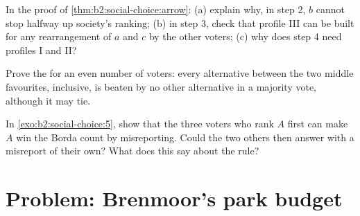 \begin{exercise}[$\star\star\star$]\label{exo:b2:social-choice:10}
In the proof of \cref{thm:b2:social-choice:arrow}: (a) explain why, in step 2, $b$ cannot stop halfway
up society's ranking; (b) in step 3, check that profile III can be built for any rearrangement of $a$ and
$c$ by the other voters; (c) why does step 4 need profiles I and II?
\end{exercise}

\begin{exercise}[$\star\star\star$]\label{exo:b2:social-choice:11}
Prove the  for an even number of voters: every alternative between the two middle
favourites, inclusive, is beaten by no other alternative in a majority vote, although it may tie.
\end{exercise}

\begin{exercise}[$\star\star\star$]\label{exo:b2:social-choice:12}
In \cref{exo:b2:social-choice:5}, show that the three voters who rank $A$ first can make $A$ win the Borda count
by misreporting. Could the two others then answer with a misreport of their own? What does this say
about the rule?
\end{exercise}

\section{Problem: Brenmoor's park budget}\label{sec:b2:social-choice:problem}

